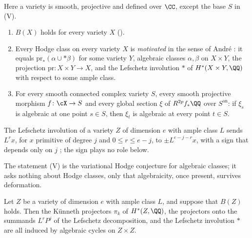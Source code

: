 \begin{definition}\label{def:lmv}
Here a variety is smooth, projective and defined over $\CC$, except the base
$S$ in \textup{(V)}.
\begin{enumerate}[leftmargin=3.0em,itemsep=3pt]
\item[\textup{(L)}] $B(X)$ holds for every variety $X$ ().
\item[\textup{(M)}] Every Hodge class on every variety $X$ is
  \emph{motivated} in the sense of Andr\'e \cite[\S2.1]{And96b}: it equals
  $\mathrm{pr}_{*}(\alpha\cup{*}\beta)$ for some variety $Y$, algebraic
  classes $\alpha,\beta$ on $X\times Y$, the projection
  $\mathrm{pr}\colon X\times Y\to X$, and the Lefschetz involution ${*}$ of
  $H^{*}(X\times Y,\QQ)$ with respect to some ample class.
\item[\textup{(V)}] For every smooth connected complex variety $S$, every
  smooth projective morphism $f\colon\cX\to S$ and every global section $\xi$
  of $R^{2p}f_{*}\QQ$ over $S^{\mathrm{an}}$: if $\xi_{s}$ is algebraic at one
  point $s\in S$, then $\xi_{t}$ is algebraic at every point $t\in S$.
\end{enumerate}
The Lefschetz involution of a variety $Z$ of dimension $e$ with ample class
$L$ sends $L^{r}x$, for $x$ primitive of degree $j$ and $0\le r\le e-j$, to
$\pm L^{e-j-r}x$, with a sign that depends only on $j$ \cite{And96b}; the
sign plays no role below.
\end{definition}

The statement (V) is the variational Hodge conjecture for algebraic classes;
it asks nothing about Hodge classes, only that algebraicity, once present,
survives deformation.

\begin{lemma}[Kleiman]\label{lem:lefinvolution}
Let $Z$ be a variety of dimension $e$ with ample class $L$, and suppose that
$B(Z)$ holds. Then the K\"unneth projectors $\pi_{k}$ of $H^{*}(Z,\QQ)$, the
projectors onto the summands $L^{r}P^{j}$ of the Lefschetz decomposition, and
the Lefschetz involution ${*}$ are all induced by algebraic cycles on
$Z\times Z$.
\end{lemma}

